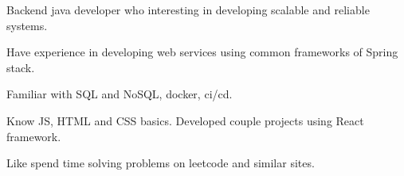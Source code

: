 \documentclass[]{cv-style}
\begin{document}
    \hspace*{0.7cm} Backend java developer who interesting in developing scalable and reliable systems.
    {\par}
    \hspace*{0.7cm} Have experience in developing web services using common frameworks of Spring stack.
    {\par}
    \hspace*{0.7cm} Familiar with SQL and NoSQL, docker, ci/cd.
    {\par}
    \hspace*{0.7cm} Know JS, HTML and CSS basics.
    Developed couple projects using React framework.
    {\par}
    \hspace*{0.7cm} Like spend time solving problems on leetcode and similar sites.

    \vspace{0.3cm}

    \footer
\end{document}

